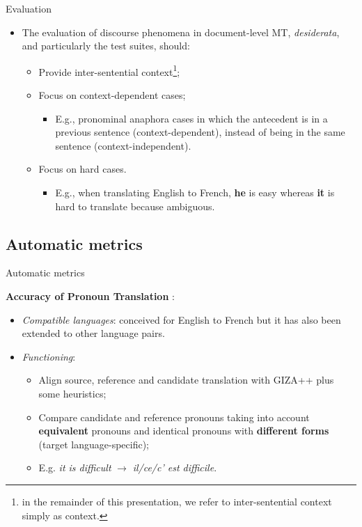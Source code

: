 \begin{frame}{Evaluation}
	
	
	\begin{itemize}
		\item The evaluation of discourse phenomena in document-level MT, \textit{desiderata}, and particularly the test suites, should:
		\begin{itemize}
			\item Provide inter-sentential context\footnote{in the remainder of this presentation, we refer to inter-sentential context simply as context.};
			\item Focus on context-dependent cases;
			\begin{itemize}
				\item E.g., pronominal anaphora cases in which the antecedent is in a previous sentence (context-dependent), instead of being in the same sentence (context-independent).
			\end{itemize}
			\item Focus on hard cases.
				\begin{itemize}
					\item E.g., when translating English to French, \textbf{he} is easy whereas \textbf{it} is hard to translate because ambiguous.
				\end{itemize}
		\end{itemize} 
	\end{itemize}
	
\end{frame}

\subsection{Automatic metrics}
\begin{frame}{Automatic metrics}

\textbf{Accuracy of Pronoun Translation} \cite{miculicich_werlen_validation_2017}:
	\begin{itemize}
		\item \textit{Compatible languages}: conceived for English to French but it has also been extended to other language pairs.
		\item \textit{Functioning}:
		\begin{itemize}
			\item Align source, reference and candidate translation with GIZA++ plus some heuristics;
			\item Compare candidate and reference pronouns taking into account \textbf{equivalent} pronouns and identical pronouns with \textbf{different forms} (target language-specific);
			\item E.g. \textit{it is difficult} $\rightarrow$ \textit{il/ce/c' est difficile}.
		\end{itemize}
	\end{itemize}

\end{frame}

